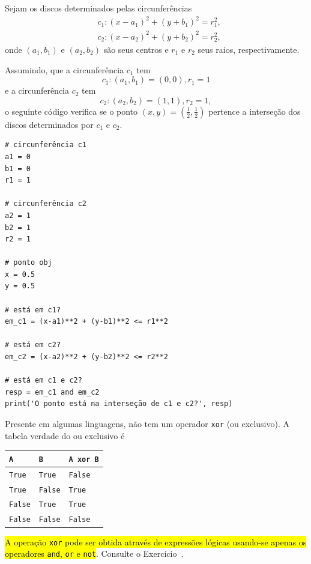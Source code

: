 \begin{ex}
  Sejam os discos determinados pelas circunferências
  \begin{align}
    & c_1: (x - a_1)^2 + (y + b_1)^2 = r_1^2, \\
    & c_2: (x - a_2)^2 + (y + b_2)^2 = r_2^2,
  \end{align}
  onde $(a_1, b_1)$ e $(a_2, b_2)$ são seus centros e $r_1$ e $r_2$ seus raios, respectivamente.

  Assumindo, que a circunferência $c_1$ tem
  \begin{equation}
    c_1: (a_1, b_1) = (0, 0), r_1 = 1
  \end{equation}
  e a circunferência $c_2$ tem
  \begin{equation}
    c_2: (a_2, b_2) = (1, 1), r_2 = 1,
  \end{equation}
  o seguinte código verifica se o ponto $(x, y) = \left(\frac{1}{2}, \frac{1}{2}\right)$ pertence a interseção dos discos determinados por $c_1$ e $c_2$.

\begin{lstlisting}
# circunferência c1
a1 = 0
b1 = 0
r1 = 1

# circunferência c2
a2 = 1
b2 = 1
r2 = 1

# ponto obj
x = 0.5
y = 0.5

# está em c1?
em_c1 = (x-a1)**2 + (y-b1)**2 <= r1**2

# está em c2?
em_c2 = (x-a2)**2 + (y-b2)**2 <= r2**2

# está em c1 e c2?
resp = em_c1 and em_c2
print('O ponto está na interseção de c1 e c2?', resp)
\end{lstlisting}
\end{ex}

\ifisbook
\vspace{0.5cm}
\fi

\begin{obs}[\hl{Ou Exclusivo}]\label{cap_lingua_sec_bool:obs:xor}
  Presente em algumas linguagens, {\python} não tem um operador \lstinline+xor+ (ou exclusivo). A tabela verdade do ou exclusivo é
  \begin{center}
    \begin{tabular}[H]{ll|l}
      {\texttt{A}}     & {\texttt{B}}     & {\lstinline+A xor B+} \\\hline
      {\texttt{True}}  & {\texttt{True}}  & {\texttt{False}}   \\
      {\texttt{True}}  & {\texttt{False}} & {\texttt{True}}    \\
      {\texttt{False}} & {\texttt{True}}  & {\texttt{True}}    \\
      {\texttt{False}} & {\texttt{False}} & {\texttt{False}}   \\\hline    
    \end{tabular}
  \end{center}
  \hl{A operação \texttt{xor} pode ser obtida através de expressões lógicas usando-se apenas os operadores \texttt{and}, \texttt{or} e \texttt{not}}. Consulte o Exercício~.
\end{obs}

